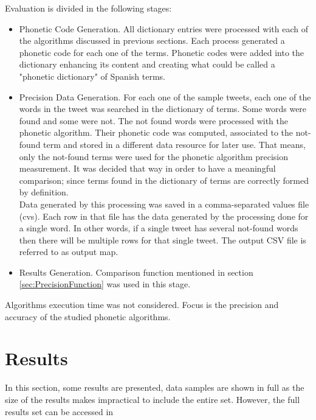\documentclass[9pt,conference]{IEEEtran}
\begin{document}
Evaluation is divided in the following stages:\\
\begin{itemize}
\item Phonetic Code Generation. All dictionary entries were processed with each of
the algorithms discussed in previous sections. Each process generated a phonetic 
code for each one of the terms. Phonetic codes were added into the dictionary 
enhancing its content and creating what could be called a "phonetic dictionary" of
Spanish terms. \\

\item Precision Data Generation. For each one of the sample tweets, each one of the 
words in the tweet was searched in the dictionary of terms. Some words were found 
and some were not. The not found words were processed with the phonetic algorithm.
Their phonetic code was computed, associated to the not-found term and stored in a
different data resource for later use. That means, only the not-found terms were used
for the phonetic algorithm precision measurement. It was decided that way in order to
have a meaningful comparison; since terms found in the dictionary of terms are 
correctly formed by definition.\\
Data generated by this processing was saved in a comma-separated values file (cvs).
Each row in that file has the data generated by the processing done for a single word.
In other words, if a single tweet has several not-found words then there will be multiple
rows for that single tweet. The output CSV file is referred to as output map.\\

\item Results Generation. Comparison function mentioned in section \ref{sec:PrecisionFunction} 
was used in this stage. 

\end{itemize}

Algorithms execution time was not considered. Focus is the precision and accuracy of
the studied phonetic algorithms.


\section{Results}
In this section, some results are presented, data samples are shown in full as the size of 
the results makes impractical to include the entire set. However, the full results set can be 
accessed in \cite{ref:40}\\
\end{document}

